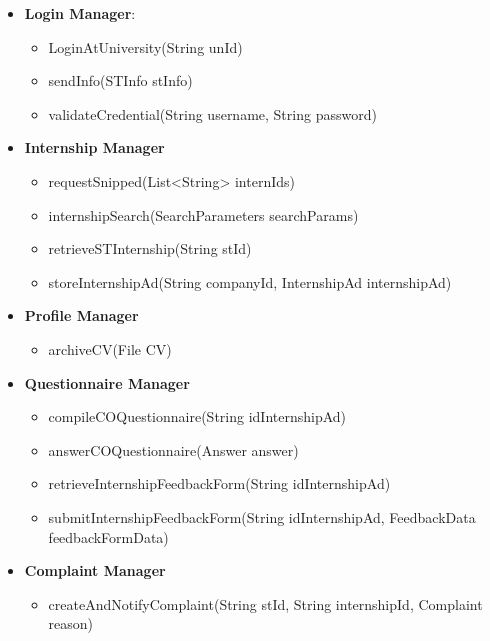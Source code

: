 \begin{itemize}
      \item \textbf{Login Manager}:
            \begin{itemize}
                  \item LoginAtUniversity(String unId)
                  \item sendInfo(STInfo stInfo)
                  \item validateCredential(String username, String password)
            \end{itemize}

      \item \textbf{Internship Manager}
            \begin{itemize}
                  \item requestSnipped(List<String> internIds)
                  \item internshipSearch(SearchParameters searchParams)
                  \item retrieveSTInternship(String stId)
                  \item storeInternshipAd(String companyId, InternshipAd internshipAd)
            \end{itemize}

      \item \textbf{Profile Manager}
            \begin{itemize}
                  \item archiveCV(File CV)
            \end{itemize}

      \item \textbf{Questionnaire Manager}
            \begin{itemize}
                  \item compileCOQuestionnaire(String idInternshipAd)
                  \item answerCOQuestionnaire(Answer answer)
                  \item retrieveInternshipFeedbackForm(String idInternshipAd)
                  \item submitInternshipFeedbackForm(String idInternshipAd, FeedbackData feedbackFormData)
            \end{itemize}

      \item \textbf{Complaint Manager}
            \begin{itemize}
                  \item createAndNotifyComplaint(String stId, String internshipId, Complaint reason)
            \end{itemize}


\end{itemize}
